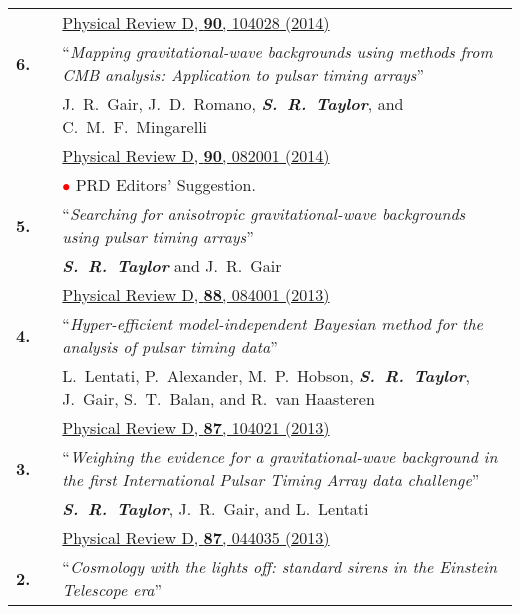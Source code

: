 \documentclass[11pt,letterpaper,sans]{moderncv}
\begin{document}
{\begin{longtable}{rp{0.3cm}p{15.8cm}}
&& \href{http://journals.aps.org/prd/abstract/10.1103/PhysRevD.90.104028}{{\color{color1} Physical Review D, \textbf{90}, 104028 (2014)}} \vspace{0.09cm}\\
\textbf{6.} & & ``\textit{Mapping gravitational-wave backgrounds using methods from CMB analysis: Application to pulsar timing arrays}'' \\ 
&& J.~R.~Gair, J.~D.~Romano, \textit{\textbf{S.~R.~Taylor}}, and C.~M.~F.~Mingarelli \\ 
&& \href{http://journals.aps.org/prd/abstract/10.1103/PhysRevD.90.082001}{{\color{color1} Physical Review D, \textbf{90}, 082001 (2014)}} \\
&& \textcolor{red}{$\bullet$} PRD Editors' Suggestion.\vspace{0.09cm}\\
\textbf{5.} & & ``\textit{Searching for anisotropic gravitational-wave backgrounds using pulsar timing arrays}'' \\ 
&& \textit{\textbf{S.~R.~Taylor}} and J.~R.~Gair \\ 
&& \href{http://journals.aps.org/prd/abstract/10.1103/PhysRevD.88.084001}{{\color{color1} Physical Review D, \textbf{88}, 084001 (2013)}} \vspace{0.09cm}\\
\textbf{4.} & & ``\textit{Hyper-efficient model-independent Bayesian method for the analysis of pulsar timing data}'' \\ 
&& L.~Lentati, P.~Alexander, M.~P.~Hobson, \textit{\textbf{S.~R.~Taylor}}, J.~Gair, S.~T.~Balan, and R.~van Haasteren \\ 
&& \href{http://journals.aps.org/prd/abstract/10.1103/PhysRevD.87.104021}{{\color{color1} Physical Review D, \textbf{87}, 104021 (2013)}} \vspace{0.09cm}\\
\textbf{3.} & & ``\textit{Weighing the evidence for a gravitational-wave background in the first International Pulsar Timing Array data challenge}'' \\ 
&& \textit{\textbf{S.~R.~Taylor}}, J.~R.~Gair, and L.~Lentati \\ 
&& \href{http://journals.aps.org/prd/abstract/10.1103/PhysRevD.87.044035}{{\color{color1} Physical Review D, \textbf{87}, 044035 (2013)}} \vspace{0.09cm}\\
\textbf{2.} & & ``\textit{Cosmology with the lights off: standard sirens in the Einstein Telescope era}'' \\ 

\end{longtable}}
\end{document}
